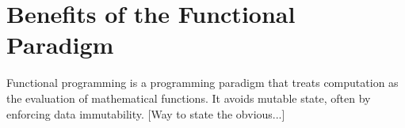 \documentclass{l4proj}
\begin{document}







\section{Benefits of the Functional Paradigm}

Functional programming is a programming paradigm that treats computation as the evaluation of mathematical functions.
It avoids mutable state, often by enforcing data immutability.
[Way to state the obvious...]
\end{document}
